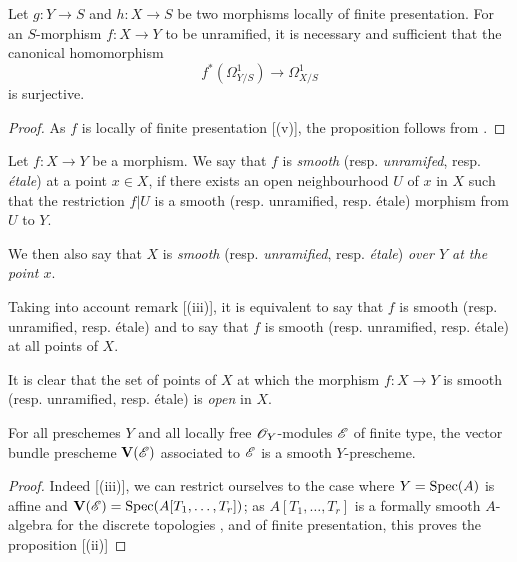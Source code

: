 \begin{proposition}[17.3.6]
\label{IV.17.3.6}
Let $g:Y\to S$ and $h:X\to S$ be two morphisms locally of finite presentation.
For an $S$-morphism $f:X\to Y$ to be unramified, it is necessary and sufficient that the canonical homomorphism 
\[
  f^*(\Omega_{Y/S}^1)\to\Omega_{X/S}^1
\]
is surjective.
\end{proposition}

\begin{proof}
As $f$ is locally of finite presentation [(v)], the proposition follows from .
\end{proof}

\begin{definition}[17.3.7]
\label{IV.17.3.7}
Let $f:X\to Y$ be a morphism.
We say that $f$ is \emph{smooth} (resp. \emph{unramifed}, resp. \emph{\'etale}) at a point $x\in X$, if there exists an open neighbourhood $U$ of $x$ in $X$ such that the restriction $f|U$ is a smooth (resp. unramified, resp. \'etale) morphism from $U$ to $Y$.
\end{definition}

We then also say that $X$ is \emph{smooth} (resp. \emph{unramified}, resp. \emph{\'etale}) \emph{over $Y$ at the point $x$}.

Taking into account remark [(iii)], it is equivalent to say that $f$ is smooth (resp. unramified, resp. \'etale) and to say that $f$ is smooth (resp. unramified, resp. \'etale) at all points of $X$.

It is clear that the set of points of $X$ at which the morphism $f:X\to Y$ is smooth (resp. unramified, resp. \'etale) is \emph{open} in $X$.

\begin{proposition}[17.3.8]
\label{IV.17.3.8}
For all preschemes $Y$ and all locally free $\mathscr{O}_Y$-modules $\mathscr{E}$ of finite type, the vector bundle prescheme $\mathbf{V}(\mathscr{E})$  associated to $\mathscr{E}$ is a smooth $Y$-prescheme.
\end{proposition}

\begin{proof}
Indeed [(iii)], we can restrict ourselves to the case where $Y=\operatorname{Spec}(A)$ is affine and $\mathbf{V}(\mathscr{E})=\operatorname{Spec}(A[T_1,\dots,T_r])$;
as $A[T_1,\dots,T_r]$ is a formally smooth $A$-algebra for the discrete topologies , and of finite presentation, this proves the proposition [(ii)] 
\end{proof}

